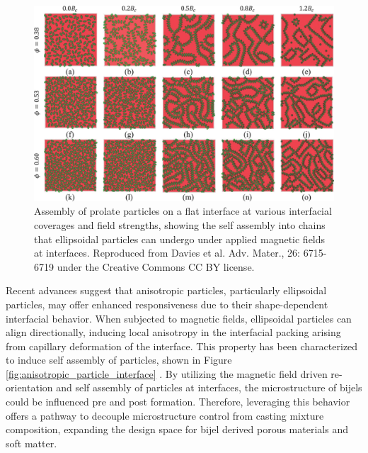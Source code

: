 \begin{figure}[h]
    \centering
    \includegraphics[scale = 0.4]{figures/introduction/anisotropic_particles_assembly.jpg}
    \caption{Assembly of prolate particles on a flat interface at various interfacial coverages and field strengths,
             showing the self assembly into chains that ellipsoidal particles can undergo under applied magnetic fields at
             interfaces. \cite{davies_assembling_2014} Reproduced from Davies et al. Adv. Mater., 26: 6715-6719 under the 
             Creative Commons CC BY license.}
    \label{fig:anisotropic_assembly}
\end{figure}

Recent advances suggest that anisotropic particles, particularly ellipsoidal particles, may offer enhanced responsiveness due to their shape-dependent 
interfacial behavior. When subjected to magnetic fields, ellipsoidal particles can align directionally, inducing local anisotropy in the interfacial 
packing arising from capillary deformation of the interface. This property has been characterized to induce self assembly of particles, 
shown in Figure \ref{fig:anisotropic_particle_interface} 
\cite{bresme_orientational_2007, davies_assembling_2014, newton_influence_2014}. By utilizing the magnetic field driven re-orientation and self assembly 
of particles at interfaces, the microstructure of bijels could be influenced pre and post formation. Therefore, leveraging this behavior offers a 
pathway to decouple microstructure control from casting mixture composition, expanding the design space for bijel derived porous materials and
soft matter.

